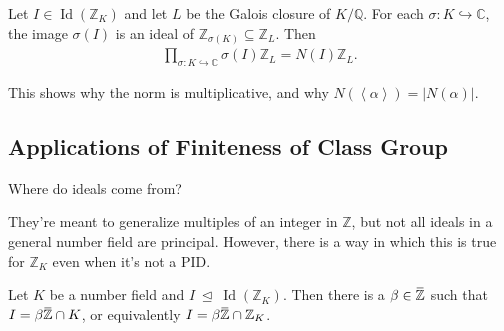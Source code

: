\begin{theorem}[?]

Let \(I\in \operatorname{Id}({\mathbb{Z}}_K)\) and let \(L\) be the
Galois closure of \(K/{\mathbb{Q}}\). For each
\(\sigma: K\hookrightarrow{\mathbb{C}}\), the image \(\sigma(I)\) is an
ideal of \({\mathbb{Z}}_{\sigma(K)} \subseteq {\mathbb{Z}}_L\). Then
\begin{align*}
\prod_{\sigma: K\hookrightarrow{\mathbb{C}}} \sigma(I) {\mathbb{Z}}_L = N(I) {\mathbb{Z}}_L
.\end{align*}

\end{theorem}

\begin{remark}

This shows why the norm is multiplicative, and why
\(N( \left\langle{ \alpha }\right\rangle) = |N( \alpha ) |\).

\end{remark}

\hypertarget{applications-of-finiteness-of-class-group}{%
\subsection{Applications of Finiteness of Class
Group}\label{applications-of-finiteness-of-class-group}}

\begin{question}

Where do ideals come from?

\end{question}

\begin{remark}

They're meant to generalize multiples of an integer in \({\mathbb{Z}}\),
but not all ideals in a general number field are principal. However,
there is a way in which this is true for \({\mathbb{Z}}_K\) even when
it's not a PID.

\end{remark}

\begin{theorem}

Let \(K\) be a number field and
\(I{~\trianglelefteq~}\operatorname{Id}({\mathbb{Z}}_K)\). Then there is
a
\(\beta\in \mkern 1.5mu\overline{\mkern-1.5mu{\mathbb{Z}}\mkern-1.5mu}\mkern 1.5mu\)
such that
\(I = \beta \mkern 1.5mu\overline{\mkern-1.5mu{\mathbb{Z}}\mkern-1.5mu}\mkern 1.5mu \cap K\),
or equivalently
\(I = \beta \mkern 1.5mu\overline{\mkern-1.5mu{\mathbb{Z}}\mkern-1.5mu}\mkern 1.5mu \cap{\mathbb{Z}}_K\).

\end{theorem}

